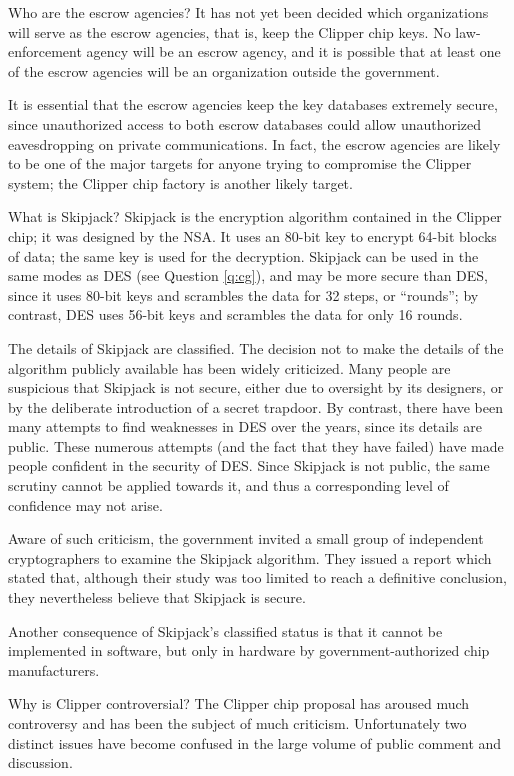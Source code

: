 {Who are the escrow agencies?}
It has not yet been decided which organizations will serve as the escrow
agencies, that is, keep the Clipper chip keys. No law-enforcement agency
will be an escrow agency, and it is possible that at least one of the
escrow agencies will be an organization outside the government.

It is essential that the escrow agencies keep the key databases
extremely secure, since unauthorized access to both escrow 
databases could allow unauthorized eavesdropping on private
communications. In fact, the escrow agencies are likely to be one
of the major targets for anyone trying to compromise the Clipper
system; the Clipper chip factory is another likely target.

{What is Skipjack?}
Skipjack is the encryption algorithm contained in the Clipper chip; it was 
designed by the NSA. It uses an 80-bit key to encrypt 64-bit blocks of data; 
the same key is used for the decryption. Skipjack can be used in the same 
modes as DES (see Question \ref{q:cg}), and may be more secure than DES, since
it uses 80-bit keys and scrambles the data for 32 steps, or ``rounds''; by
contrast, DES uses 56-bit keys and scrambles the data for only 16 rounds.

The details of Skipjack are classified. The decision not to make the details 
of the algorithm publicly available has been widely criticized. Many people 
are suspicious that Skipjack is not secure, either due to oversight by its 
designers, or by the deliberate introduction of a secret trapdoor. By contrast,
there have been many attempts to find weaknesses in DES over the years, since 
its details are public. These numerous attempts (and the fact that they have 
failed) have made people confident in the security of DES. Since Skipjack is
not public, the same scrutiny cannot be applied towards it, and thus a 
corresponding level of confidence may not arise. 

Aware of such criticism, the government invited a small group of independent 
cryptographers to examine the Skipjack algorithm. They issued a report 
\cite{brickell-skipjack} which stated that, although their study was too 
limited to reach a definitive conclusion, they nevertheless believe that 
Skipjack is secure.

Another consequence of Skipjack's classified status is that it cannot
be implemented in software, but only in hardware by government-authorized
chip manufacturers.

{Why is Clipper controversial?}
The Clipper chip proposal has aroused much controversy and has been the
subject of much criticism. Unfortunately two distinct issues have become 
confused in the large volume of public comment and discussion. 

